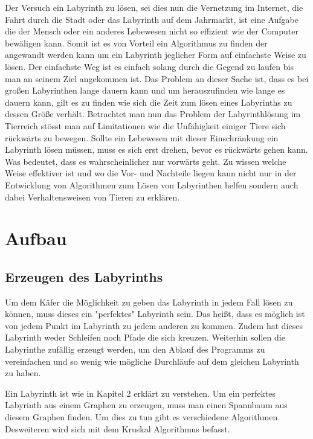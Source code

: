 \documentclass[12pt, a4paper, titlepage]{article}
\begin{document}
\bigskip

Der Versuch ein Labyrinth zu lösen, sei dies nun die Vernetzung im Internet, die Fahrt durch die Stadt oder das Labyrinth auf dem Jahrmarkt, ist eine Aufgabe die der Mensch oder ein anderes Lebewesen nicht so effizient wie der Computer bewäligen kann.
Somit ist es von Vorteil ein Algorithmus zu finden der angewandt werden kann um ein Labyrinth jeglicher Form auf einfachste Weise zu lösen. 
Der einfachste Weg ist es einfach solang durch die Gegend zu laufen bis man an seinem Ziel angekommen ist.
Das Problem an dieser Sache ist, dass es bei großen Labyrinthen lange dauern kann und um herauszufinden wie lange es dauern kann, gilt es zu finden wie sich die Zeit zum lösen eines Labyrinths zu dessen Größe verhält.
Betrachtet man nun das Problem der Labyrinthlösung im Tierreich stösst man auf Limitationen wie die Unfähigkeit einiger Tiere sich rückwärts zu bewegen. Sollte ein Lebewesen mit dieser Einschränkung ein Labyrinth lösen müssen, muss es sich erst drehen, bevor es rückwärts gehen kann. Was bedeutet, dass es wahrscheinlicher nur vorwärts geht. Zu wissen welche Weise effektiver ist und wo die Vor- und Nachteile liegen kann nicht nur in der Entwicklung von Algorithmen zum Lösen von Labyrinthen helfen sondern auch dabei Verhaltensweisen von Tieren zu erklären.


\newpage

\section{Aufbau}

\subsection{Erzeugen des Labyrinths}

Um dem Käfer die Möglichkeit zu geben das Labyrinth in jedem Fall lösen zu können, muss dieses ein "perfektes" Labyrinth sein.
Das heißt, dass es möglich ist von jedem Punkt im Labyrinth zu jedem anderen zu kommen.
Zudem hat dieses Labyrinth weder Schleifen noch Pfade die sich kreuzen.
Weiterhin sollen die Labyrinthe zufällig erzeugt werden, um den Ablauf des Programms zu vereinfachen und so wenig wie mögliche Durchläufe auf dem gleichen Labyrinth zu haben.

\bigskip

Ein Labyrinth ist wie in Kapitel 2 erklärt zu verstehen.
Um ein perfektes Labyrinth aus einem Graphen zu erzeugen, muss man einen Spannbaum aus diesem Graphen finden.
Um dies zu tun gibt es verschiedene Algorithmen.
Desweiteren wird sich mit dem Kruskal Algorithmus befasst.
\end{document}
